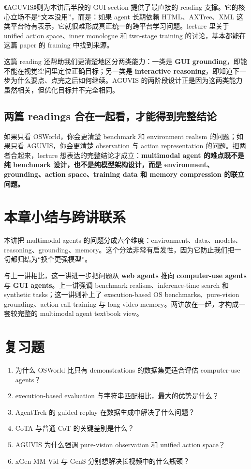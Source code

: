 《AGUVIS》则为本讲后半段的 GUI section 提供了最直接的 reading 支撑。它的核心立场不是“文本没用”，而是：如果 agent 长期依赖 HTML、AXTree、XML 这类平台特有表示，它就很难形成真正统一的跨平台学习问题。lecture 里关于 unified action space、inner monologue 和 two-stage training 的讨论，基本都能在这篇 paper 的 framing 中找到来源。

这篇 reading 还帮助我们更清楚地区分两类能力：一类是 \textbf{GUI grounding}，即能不能在视觉空间里定位正确目标；另一类是 \textbf{interactive reasoning}，即知道下一步为什么要点、点完之后如何继续。AGUVIS 的两阶段设计正是因为这两类能力虽然相关，但优化目标并不完全相同。

\subsection{两篇 readings 合在一起看，才能得到完整结论}

如果只看 OSWorld，你会更清楚 benchmark 和 environment realism 的问题；如果只看 AGUVIS，你会更清楚 observation 与 action representation 的问题。把两者合起来，lecture 想表达的完整结论才成立：\textbf{multimodal agent 的难点既不是纯 benchmark 设计，也不是纯模型架构设计，而是 environment、grounding、action space、training data 和 memory compression 的联立问题。}

\section{本章小结与跨讲联系}

本讲把 multimodal agents 的问题分成六个维度：environment、data、models、reasoning、grounding、memory。这个分法非常有启发性，因为它防止我们把一切都归结为“换个更强模型”。

与上一讲相比，这一讲进一步把问题从 \textbf{web agents} 推向 \textbf{computer-use agents} 与 \textbf{GUI agents}。上一讲强调 benchmark realism、inference-time search 和 synthetic tasks；这一讲则补上了 execution-based OS benchmarks、pure-vision grounding、action-call training 与 long-video memory。两讲放在一起，才构成一套较完整的 multimodal agent textbook view。

\section{复习题}
\begin{enumerate}
\item 为什么 OSWorld 比只有 demonstrations 的数据集更适合评估 computer-use agents？
\item execution-based evaluation 与字符串匹配相比，最大的优势是什么？
\item AgentTrek 的 guided replay 在数据生成中解决了什么问题？
\item CoTA 与普通 CoT 的关键差别是什么？
\item AGUVIS 为什么强调 pure-vision observation 和 unified action space？
\item xGen-MM-Vid 与 GenS 分别想解决长视频中的什么瓶颈？
\end{enumerate}

